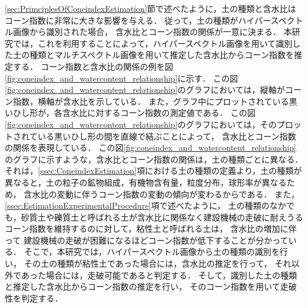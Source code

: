 \ref{sec:PrimciplesOfConeindexEstimation}節で述べたように，土の種類と含水比はコーン指数に非常に大きな影響を与える．
従って，土の種類がハイパースペクトル画像から識別された場合，
含水比とコーン指数の関係が一意に決まる．
本研究では，これを利用することによって，ハイパースペクトル画像を用いて識別した土の種類とマルチスペクトル画像を用いて推定した含水比からコーン指数を推定する．
コーン指数と含水比の関係の例を図\ref{fig:coneindex_and_watercontent_relationship}に示す．
この図\ref{fig:coneindex_and_watercontent_relationship}のグラフにおいては，縦軸がコーン指数，横軸が含水比を示している．
また，グラフ中にプロットされている黒いひし形が，各含水比に対するコーン指数の測定値である．
この図\ref{fig:coneindex_and_watercontent_relationship}のグラフにおいては，そのプロットされている黒いひし形の間を直線で結ぶことによって，
含水比とコーン指数の関係を表現している．
この図\ref{fig:coneindex_and_watercontent_relationship}のグラフに示すような，含水比とコーン指数の関係は，土の種類ごとに異なる．
それは，\ref{ssec:ConeindexEstimation}項における土の種類の定義より，土の種類が異なると，土の粒子の鉱物組成，有機物含有量，粒度分布，球形率が異なるため，
含水比の変動に伴うコーン指数の変動の傾向が変わるからである．
また，\ref{ssec:EstimationExperimentalProcedure}項で述べたように，
土の種類のなかでも，砂質土や礫質土と呼ばれる土が含水比に関係なく建設機械の走破に耐えうるコーン指数を維持するのに対して，粘性土と呼ばれる土は，
含水比の増加に伴って
建設機械の走破が困難になるほどコーン指数が低下することが分かっている．%
そこで，本研究では，ハイパースペクトル画像から土の種類の識別を行い，
その土の種類が粘性土であった場合には，含水比の推定を行って，
それ以外であった場合には，走破可能であると判定する．
そして，識別した土の種類と推定した含水比からコーン指数の推定を行い，
そのコーン指数を用いて走破性を判定する．

